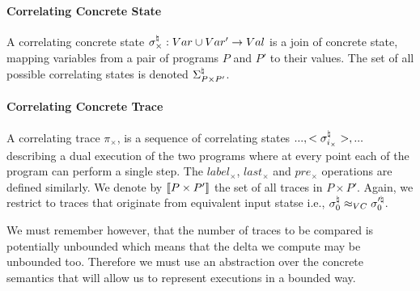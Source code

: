 \paragraph{Correlating Concrete State} 
A correlating concrete state $\sigma^\natural_{\times} : Var \cup Var' \rightarrow Val$ is a join of concrete state, mapping variables from a pair of programs $P$ and $P'$ to their values. The set of all possible correlating states is denoted $\Sigma^\natural_{P \times P'}$.

\paragraph{Correlating Concrete Trace} 
A correlating trace $\pi_{\times}$, is a sequence of correlating states $...,<\sigma^\natural_{i_{\times}}>,...$ describing a dual execution of the two programs where at every point each of the program can perform a single step. The $label_{\times}$, $last_{\times}$ and $pre_{\times}$ operations are defined similarly. We denote by $\lbrack\!\lbrack P \times P' \rbrack\!\rbrack$ the set of all traces in $P \times P'$. Again, we restrict to traces that originate from equivalent input statse i.e., $\sigma^\natural_0 \approx_{VC} \sigma'^\natural_0$.

We must remember however, that the number of traces to be compared is potentially unbounded which means that the delta we compute may be unbounded too. Therefore we must use an abstraction over the concrete semantics that will allow us to represent executions in a bounded way.
